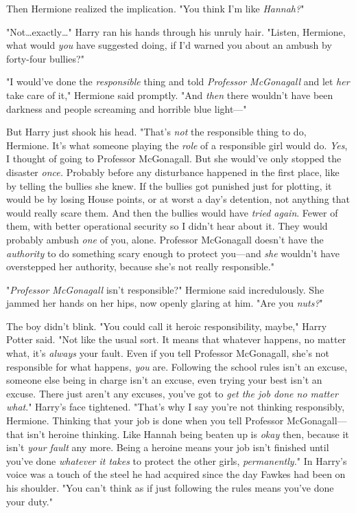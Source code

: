 Then Hermione realized the implication. "You think I'm like \emph{Hannah?}"

"Not…exactly…" Harry ran his hands through his unruly hair.
"Listen, Hermione, what would \emph{you} have suggested doing, if I'd warned
you about an ambush by forty-four bullies?"

"I would've done the \emph{responsible} thing and told \emph{Professor
McGonagall} and let \emph{her} take care of it," Hermione said promptly. "And
\emph{then} there wouldn't have been darkness and people screaming and horrible
blue light—"

But Harry just shook his head. "That's \emph{not} the responsible thing to do,
Hermione. It's what someone playing the \emph{role} of a responsible girl would
do. \emph{Yes}, I thought of going to Professor McGonagall. But she would've
only stopped the disaster \emph{once.} Probably before any disturbance happened
in the first place, like by telling the bullies she knew. If the bullies got
punished just for plotting, it would be by losing House points, or at worst a
day's detention, not anything that would really scare them. And then the
bullies would have \emph{tried again}. Fewer of them, with better operational
security so I didn't hear about it. They would probably ambush \emph{one} of
you, alone. Professor McGonagall doesn't have the \emph{authority} to do
something scary enough to protect you—and \emph{she} wouldn't have
overstepped her authority, because she's not really responsible."

"\emph{Professor McGonagall} isn't responsible?" Hermione said incredulously.
She jammed her hands on her hips, now openly glaring at him. "Are you
\emph{nuts?}"

The boy didn't blink. "You could call it heroic responsibility, maybe," Harry
Potter said. "Not like the usual sort. It means that whatever happens, no
matter what, it's \emph{always} your fault. Even if you tell Professor
McGonagall, she's not responsible for what happens, \emph{you} are. Following
the school rules isn't an excuse, someone else being in charge isn't an excuse,
even trying your best isn't an excuse. There just aren't any excuses, you've
got to \emph{get the job done no matter what}." Harry's face tightened. "That's
why I say you're not thinking responsibly, Hermione. Thinking that your job is
done when you tell Professor McGonagall—that isn't heroine thinking. Like
Hannah being beaten up is \emph{okay} then, because it isn't \emph{your fault}
any more. Being a heroine means your job isn't finished until you've done
\emph{whatever it takes} to protect the other girls, \emph{permanently.}" In Harry's
voice was a touch of the steel he had acquired since the day Fawkes had been on
his shoulder. "You can't think as if just following the rules means you've done
your duty."

